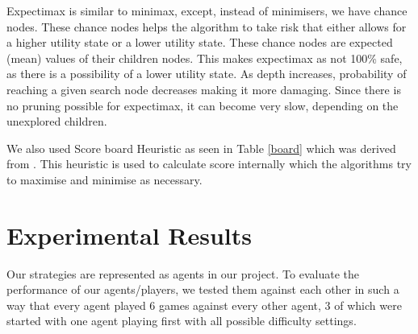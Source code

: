\documentclass{svproc}
\begin{document}
Expectimax is similar to minimax, except, instead of minimisers, we have chance nodes. These chance nodes helps the algorithm to take risk that either allows for a higher utility state or a lower utility state. These chance nodes are expected (mean) values of their children nodes. This makes expectimax as not 100\% safe, as there is a possibility of a lower utility state. As depth increases, probability of reaching a given search node decreases making it more damaging. Since there is no pruning possible for expectimax, it can become very slow, depending on the unexplored children.

We also used Score board Heuristic as seen in Table \ref{board} which was derived from \cite{hboard}. This heuristic is used to calculate score internally which the algorithms try to maximise and minimise as necessary.

\begin{table}[H]
\centering
\begin{adjustbox}{width=4cm,center}
\end{adjustbox}
\caption{Score Board Heuristic}
\label{board}
\end{table}

\section{Experimental Results}\label{4}

Our strategies are represented as agents in our project. To evaluate the performance of our agents/players, we tested them against each other in such a way that every agent played 6 games against every other agent, 3 of which were started with one agent playing first with all possible difficulty settings.
\end{document}

